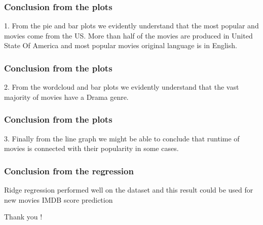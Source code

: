 \documentclass{beamer}
\begin{document}
\begin{frame}
\frametitle{Conclusion from the plots}

1. From the pie and bar plots we evidently understand that the most popular and movies come from the US. More than half of the movies are produced in United State Of America and most popular movies original language is in English. 
\end{frame}

\begin{frame}
\frametitle{Conclusion from the plots}

2. From the wordcloud and bar plots we evidently understand that the vast majority of movies
have a Drama genre.
\end{frame}

\begin{frame}
\frametitle{Conclusion from the plots}

3. Finally from the line graph we might be able to conclude that runtime of movies is connected with their popularity in some cases. 
\end{frame}

\begin{frame}
\frametitle{Conclusion from the regression}

Ridge regression performed well on the dataset and this result could be used for new movies IMDB score prediction

\end{frame}

\begin{frame}
	\centering
	Thank you !
\end{frame}
\end{document}
